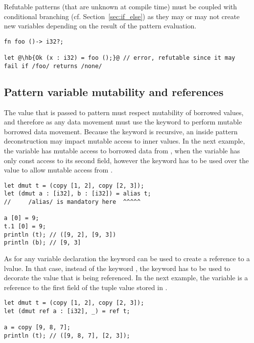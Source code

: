 Refutable patterns (that are unknown at compile time) must be coupled with
conditional branching (cf. Section~\ref{sec:if_else}) as they may or may not
create new variables depending on the result of the pattern evaluation.

\begin{lstlisting}[style=coloredverbatim, escapechar=@]
fn foo ()-> i32?;

let @\hb{Ok (x : i32) = foo ();}@ // error, refutable since it may fail if /foo/ returns /none/
\end{lstlisting}

\subsection{Pattern variable mutability and references}

The value that is passed to pattern must respect mutability of borrowed values,
and therefore as any data movement must use the keyword  to
perform mutable borrowed data movement. Because the keyword is recursive, an
inside pattern deconstruction may impact mutable access to inner values. In the
next example, the variable  has mutable access to borrowed data from
, when the variable  has only const access to its second
field, however the keyword  has to be used over the value
 to allow mutable access from .

\begin{lstlisting}[style=coloredverbatim, escapechar=@]
let dmut t = (copy [1, 2], copy [2, 3]);
let (dmut a : [i32], b : [i32]) = alias t;
//     /alias/ is mandatory here  ^^^^^

a [0] = 9;
t.1 [0] = 9;
println (t); // ([9, 2], [9, 3])
println (b); // [9, 3]
\end{lstlisting}

As for any variable declaration the keyword  can be used to create a
reference to a lvalue. In that case, instead of the keyword \token{alias}, the
keyword \token{ref} has to be used to decorate the value that is being
referenced. In the next example, the variable \token{a} is a reference to the
first field of the tuple value stored in \token{t}.

\begin{lstlisting}[style=coloredverbatim, escapechar=@]
let dmut t = (copy [1, 2], copy [2, 3]);
let (dmut ref a : [i32], _) = ref t;

a = copy [9, 8, 7];
println (t); // ([9, 8, 7], [2, 3]);
\end{lstlisting}

